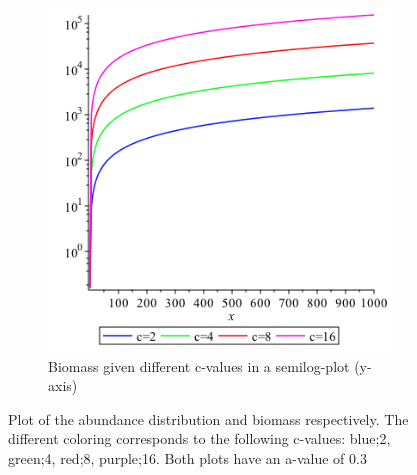 \documentclass{article}
\numberwithin{equation}{section} %
\begin{document}
\begin{figure}[t!]
\begin{subfigure}[t]{0.5\textwidth}
\end{subfigure}
\begin{subfigure}[t]{0.5\textwidth}
\includegraphics[width=0.9\linewidth]{exercises/e1p2}
\caption{Biomass given different c-values in a semilog-plot (y-axis)}
\label{fig:e1p2}
\end{subfigure}
\caption{Plot of the abundance distribution and biomass respectively. The different coloring corresponds to the following c-values: blue;2, green;4, red;8, purple;16. Both plots have an a-value of 0.3} 
\label{fig:e1p12}
\end{figure}
\newpage
\end{document}
